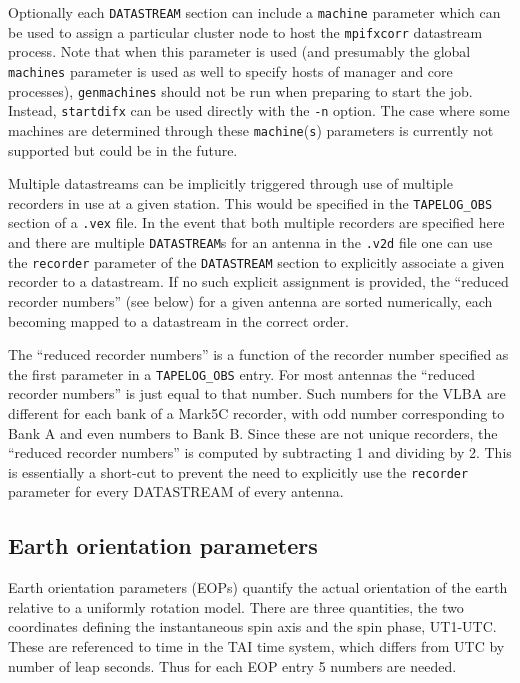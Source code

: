\documentclass[12pt]{article}
\begin{document}
Optionally each {\tt DATASTREAM} section can include a {\tt machine} parameter which can be used to assign a particular cluster node to host the {\tt mpifxcorr} datastream process.
Note that when this parameter is used (and presumably the global {\tt machines} parameter is used as well to specify hosts of manager and core processes), {\tt genmachines} should not be run when preparing to start the job. 
Instead, {\tt startdifx} can be used directly with the {\tt -n} option.
The case where some machines are determined through these {\tt machine}({\tt s}) parameters is currently not supported but could be in the future.


Multiple datastreams can be implicitly triggered through use of multiple recorders in use at a given station.
This would be specified in the {\tt TAPELOG\_OBS} section of a {\tt .vex} file.
In the event that both multiple recorders are specified here and there are multiple {\tt DATASTREAM}s for an antenna in the {\tt .v2d} file one can use the {\tt recorder} parameter of the {\tt DATASTREAM} section to explicitly associate a given recorder to a datastream.
If no such explicit assignment is provided, the ``reduced recorder numbers'' (see below) for a given antenna are sorted numerically, each becoming mapped to a datastream in the correct order.

The ``reduced recorder numbers'' is a function of the recorder number specified as the first parameter in a {\tt TAPELOG\_OBS} entry.
For most antennas the ``reduced recorder numbers'' is just equal to that number.
Such numbers for the VLBA are different for each bank of a Mark5C recorder, with odd number corresponding to Bank A and even numbers to Bank B.
Since these are not unique recorders, the ``reduced recorder numbers'' is computed by subtracting 1 and dividing by 2.
This is essentially a short-cut to prevent the need to explicitly use the {\tt recorder} parameter for every DATASTREAM of every antenna.

\subsection{Earth orientation parameters}

Earth orientation parameters (EOPs) quantify the actual orientation of the earth relative to a uniformly rotation model.
There are three quantities, the two coordinates defining the instantaneous spin axis and the spin phase, UT1-UTC.
These are referenced to time in the TAI time system, which differs from UTC by number of leap seconds.
Thus for each EOP entry 5 numbers are needed.
\end{document}
